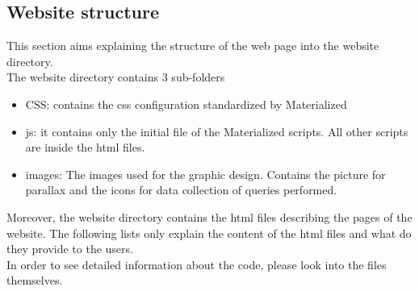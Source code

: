 \subsection{Website structure}
This section aims explaining the structure of the web page into the website directory.
\vspace{4mm}
\\ The website  directory contains 3 sub-folders
\begin{itemize}
    \item CSS: contains the css configuration standardized by Materialized
    \item js: it contains only the initial file of the Materialized scripts. All other scripts are inside the html files.
    \item images: The images used for the graphic design. Contains the picture for parallax and the icons for data collection of queries performed.
\end{itemize}

Moreover, the website directory contains the html files describing the pages of the website.
The following lists only explain the content of the html files and what do they provide to the users. \\In order to see detailed information about the code, please look into the files themselves.

